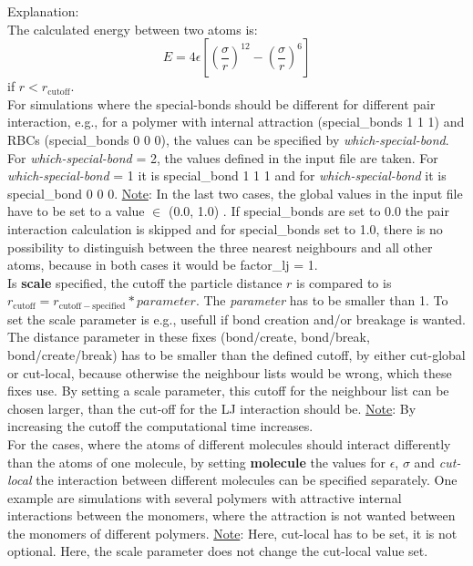 \documentclass[a4paper,10pt]{scrreprt}
\begin{document}
Explanation:
\\[2ex]
The calculated energy between two atoms is:
\begin{equation}\label{eq:LJ/own}
E = 4\epsilon \left[ \left( \frac{\sigma}{r} \right)^{12} -  \left(  \frac{\sigma}{r} \right)^6 \right]
\end{equation}
if $r<r_\mathrm{cutoff}$.
\\[2ex]
For simulations where the special-bonds should be different for different pair interaction, e.g., for a polymer with internal attraction (special\_bonds 1 1 1) and RBCs (special\_bonds 0 0 0), the values can be specified by \textit{which-special-bond}. For \textit{which-special-bond} = 2, the values defined in the input file are taken.
For \textit{which-special-bond} = 1 it is special\_bond 1 1 1 and for  \textit{which-special-bond} it is special\_bond 0 0 0.
\underline{Note}: In the last two cases, the global values in the input file have to be set to a value $\in$ (0.0, 1.0) .
If special\_bonds are set to 0.0 the pair interaction calculation is skipped and for special\_bonds set to 1.0, there is no possibility to distinguish between the three nearest neighbours and all other atoms, because in both cases it would be factor\_lj = 1.
\\[2ex]
Is \textbf{scale} specified, the cutoff the particle distance $r$ is compared to is $r_\mathrm{cutoff} = r_\mathrm{cutoff - specified}*{parameter}$.
The \textit{parameter} has to be smaller than 1.
To set the scale parameter is e.g., usefull if bond creation and/or breakage is wanted.
The distance parameter in these fixes (bond/create, bond/break, bond/create/break) has to be smaller than the defined cutoff, by either cut-global or cut-local, because otherwise the neighbour lists would be wrong, which these fixes use.
By setting a scale parameter, this cutoff for the neighbour list can be chosen larger, than the cut-off for the LJ interaction should be.
\underline{Note}: By increasing the cutoff the computational time increases.
\\[2ex]
For the cases, where the atoms of different molecules should interact differently than the atoms of one molecule, by setting \textbf{molecule} the values for $\epsilon$, $\sigma$ and \textit{cut-local} the interaction between different molecules can be specified separately.
One example are simulations with several polymers with attractive internal interactions between the monomers, where the attraction is not wanted between the monomers of different polymers.
\underline{Note}: Here, cut-local has to be set, it is not optional. Here, the scale parameter does not change the cut-local value set.
\end{document}
